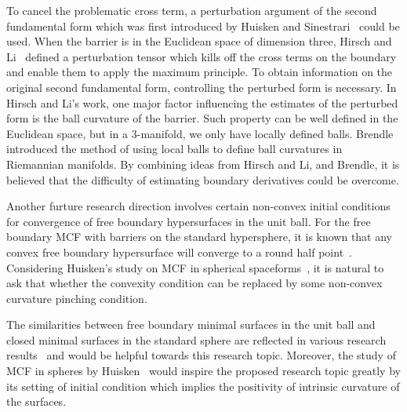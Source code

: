 To cancel the problematic cross term, a perturbation argument of the second fundamental form which was first introduced by Huisken and Sinestrari~\cite{huisken_convexity_1999} could be used. When the barrier is in the Euclidean space of dimension three, Hirsch and Li~\cite{hirsch2020contracting} defined a perturbation tensor which kills off the cross terms on the boundary and enable them to apply the maximum principle. To obtain information on the original second fundamental form, controlling the perturbed form is necessary. In Hirsch and Li’s work, one major factor influencing the estimates of the perturbed form is the ball curvature of the barrier. Such property can be well defined in the Euclidean space, but in a 3-manifold, we only have locally defined balls. Brendle~\cite{brendle2013inscribed} introduced the method of using local balls to define ball curvatures in Riemannian manifolds. By combining ideas from Hirsch and Li, and Brendle, it is believed that the difficulty of estimating boundary derivatives could be overcome.

Another furture research direction involves certain non-convex initial conditions for convergence of free boundary hypersurfaces in the unit ball. For the free boundary MCF with barriers on the standard hypersphere, it is known that any convex free boundary hypersurface will converge to a round half point~\cite{stahl_convergence_1996}. Considering Huisken’s study on MCF in spherical spaceforms~\cite{huisken_deforming_1987}, it is natural to ask that whether the convexity condition can be replaced by some non-convex curvature pinching condition.

The similarities between free boundary minimal surfaces in the unit ball and closed minimal surfaces in the standard sphere are reflected in various research results~\cite{almgren_interior_1966,nitsche_stationary_1985,Ros_stabilityof,Li2020free} and would be helpful towards this research topic. Moreover, the study of MCF in spheres by Huisken~\cite{huisken_deforming_1987} would inspire the proposed research topic greatly by its setting of initial condition which implies the positivity of intrinsic curvature of the surfaces.











\chapterend

